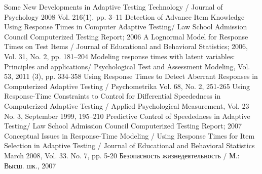 \renewcommand{\bibname}{Список использованных источников}

\begin{thebibliography}{2}
  Some New Developments in Adaptive Testing Technology / Journal of Psychology 2008 Vol. 216(1), pp. 3–11
  Detection of Advance Item Knowledge Using Response Times in Computer Adaptive Testing/ Law School Admission Council Computerized Testing Report; 2006
  A Lognormal Model for Response Times on Test Items / Journal of Educational and Behavioral Statistics; 2006, Vol. 31, No. 2, pp. 181–204
 Modeling response times with latent variables: Principles and applications/ Psychological Test and Assessment Modeling, Vol. 53, 2011 (3), pp. 334-358
 Using Response Times to Detect Aberrant Responses in Computerized Adaptive Testing / Psychometrika Vol. 68, No. 2, 251-265
 Using Response-Time Constraints to Control for Differential Speededness in Computerized Adaptive Testing / Applied Psychological Measurement, Vol. 23 No. 3, September 1999, 195–210
  Predictive Control of Speededness in Adaptive Testing/ Law School Admission Council Computerized Testing Report; 2007
  Conceptual Issues in Response-Time Modeling / 
  Using Response Times for Item Selection in Adaptive Testing / Journal of Educational and Behavioral Statistics March 2008, Vol. 33. No. 7, pp. 5-20
  Безопасность жизнедеятельность / М.: Высш. шк., 2007
\end{thebibliography}